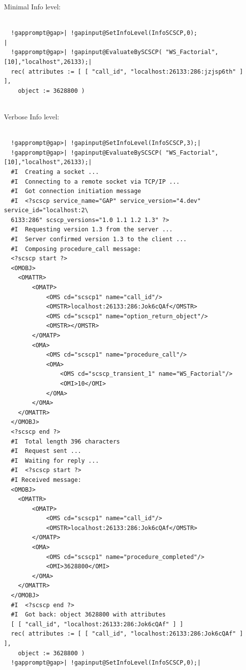 \documentclass[a4paper,11pt]{report}
\begin{document}
{{{\begin{Verbatim}[commandchars=!@|,fontsize=\small,frame=single,label=Example]
\end{Verbatim}
 

 Minimal Info level: 
\begin{Verbatim}[commandchars=!@|,fontsize=\small,frame=single,label=Example]
  
  !gapprompt@gap>| !gapinput@SetInfoLevel(InfoSCSCP,0);                              |
  !gapprompt@gap>| !gapinput@EvaluateBySCSCP( "WS_Factorial",[10],"localhost",26133);|
  rec( attributes := [ [ "call_id", "localhost:26133:286:jzjsp6th" ] ], 
    object := 3628800 )
  
\end{Verbatim}
 

 Verbose Info level: 
\begin{Verbatim}[commandchars=!@|,fontsize=\small,frame=single,label=Example]
  
  !gapprompt@gap>| !gapinput@SetInfoLevel(InfoSCSCP,3);|
  !gapprompt@gap>| !gapinput@EvaluateBySCSCP( "WS_Factorial",[10],"localhost",26133);|
  #I  Creating a socket ...
  #I  Connecting to a remote socket via TCP/IP ...
  #I  Got connection initiation message
  #I  <?scscp service_name="GAP" service_version="4.dev" service_id="localhost:2\
  6133:286" scscp_versions="1.0 1.1 1.2 1.3" ?>
  #I  Requesting version 1.3 from the server ...
  #I  Server confirmed version 1.3 to the client ...
  #I  Composing procedure_call message: 
  <?scscp start ?>
  <OMOBJ>
  	<OMATTR>
  		<OMATP>
  			<OMS cd="scscp1" name="call_id"/>
  			<OMSTR>localhost:26133:286:Jok6cQAf</OMSTR>
  			<OMS cd="scscp1" name="option_return_object"/>
  			<OMSTR></OMSTR>
  		</OMATP>
  		<OMA>
  			<OMS cd="scscp1" name="procedure_call"/>
  			<OMA>
  				<OMS cd="scscp_transient_1" name="WS_Factorial"/>
  				<OMI>10</OMI>
  			</OMA>
  		</OMA>
  	</OMATTR>
  </OMOBJ>
  <?scscp end ?>
  #I  Total length 396 characters 
  #I  Request sent ...
  #I  Waiting for reply ...
  #I  <?scscp start ?>
  #I Received message: 
  <OMOBJ>
  	<OMATTR>
  		<OMATP>
  			<OMS cd="scscp1" name="call_id"/>
  			<OMSTR>localhost:26133:286:Jok6cQAf</OMSTR>
  		</OMATP>
  		<OMA>
  			<OMS cd="scscp1" name="procedure_completed"/>
  			<OMI>3628800</OMI>
  		</OMA>
  	</OMATTR>
  </OMOBJ>
  #I  <?scscp end ?>
  #I  Got back: object 3628800 with attributes 
  [ [ "call_id", "localhost:26133:286:Jok6cQAf" ] ]
  rec( attributes := [ [ "call_id", "localhost:26133:286:Jok6cQAf" ] ], 
    object := 3628800 )
  !gapprompt@gap>| !gapinput@SetInfoLevel(InfoSCSCP,0);|
  
\end{Verbatim}
 }

}}
\end{document}

